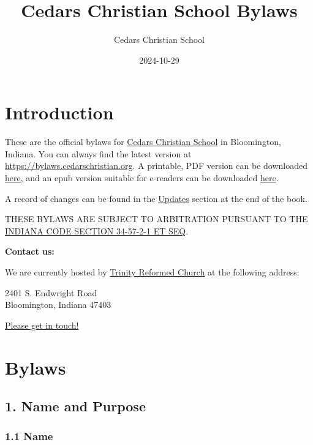 \documentclass[
]{book}
\title{Cedars Christian School Bylaws}
\author{Cedars Christian School}
\date{2024-10-29}
\begin{document}
\maketitle

{
\hypersetup{linkcolor=}
\setcounter{tocdepth}{1}
\tableofcontents
}
\chapter*{Introduction}\label{introduction}

These are the official bylaws for \href{https://cedarschristian.org}{Cedars Christian School} in Bloomington, Indiana. You can always find the latest version at \url{https://bylaws.cedarschristian.org}. A printable, PDF version can be downloaded \href{ccs-bylaws.pdf}{here}, and an epub version suitable for e-readers can be downloaded \href{ccs-bylaws.epub}{here}.

A record of changes can be found in the \href{updates.html}{Updates} section at the end of the book.

THESE BYLAWS ARE SUBJECT TO ARBITRATION PURSUANT TO THE \href{https://iga.in.gov/legislative/laws/2022/ic/titles/034\#34-57-2-1}{INDIANA CODE SECTION 34-57-2-1 ET SEQ}.

\textbf{Contact us:}

We are currently hosted by \href{https://trinityreformed.org}{Trinity Reformed Church} at the following address:

2401 S. Endwright Road\\
Bloomington, Indiana 47403

\href{https://cedarschristian.org/contact-us/}{Please get in touch!}

\mainmatter

\chapter*{Bylaws}\label{bylaws}

\section*{1. Name and Purpose}\label{name-and-purpose}

\subsection*{1.1 Name}\label{name}
\end{document}
